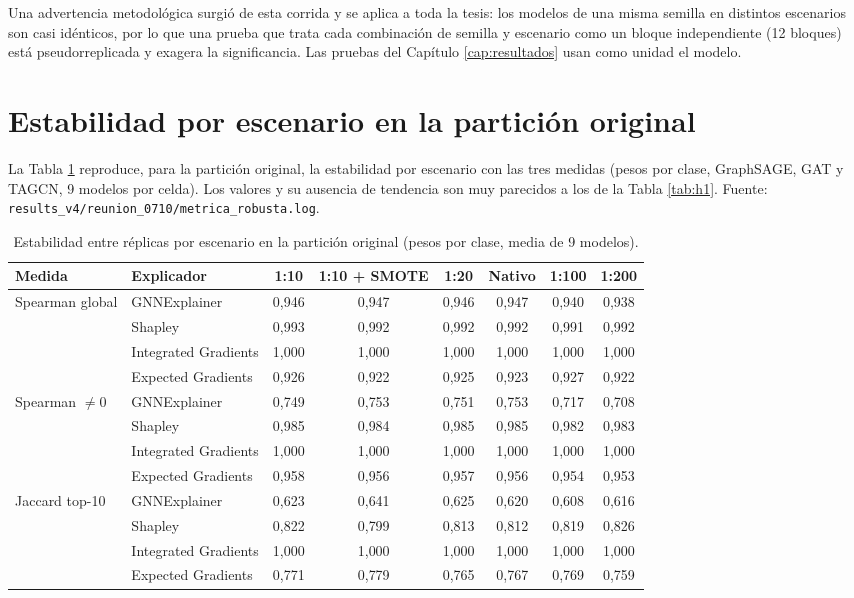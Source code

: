 Una advertencia metodológica surgió de esta corrida y se aplica a toda la tesis: los modelos de
una misma semilla en distintos escenarios son casi idénticos, por lo que una prueba que trata
cada combinación de semilla y escenario como un bloque independiente (12 bloques) está
pseudorreplicada y exagera la significancia. Las pruebas del Capítulo \ref{cap:resultados} usan
como unidad el modelo.

\section{Estabilidad por escenario en la partición original}

La Tabla \ref{tab:orig_h1} reproduce, para la partición original, la estabilidad por escenario
con las tres medidas (pesos por clase, GraphSAGE, GAT y TAGCN, 9 modelos por celda). Los valores
y su ausencia de tendencia son muy parecidos a los de la Tabla \ref{tab:h1}. Fuente:
\texttt{results\_v4/reunion\_0710/metrica\_robusta.log}.

\begin{table}[ht]
\centering
\caption{Estabilidad entre réplicas por escenario en la partición original (pesos por clase,
media de 9 modelos).}
\label{tab:orig_h1}
\scriptsize
\setlength{\tabcolsep}{4pt}
\begin{tabular}{llcccccc}
\toprule
Medida & Explicador & 1:10 & 1:10 + SMOTE & 1:20 & Nativo & 1:100 & 1:200 \\
\midrule
Spearman global & GNNExplainer & 0{,}946 & 0{,}947 & 0{,}946 & 0{,}947 & 0{,}940 & 0{,}938 \\
 & Shapley & 0{,}993 & 0{,}992 & 0{,}992 & 0{,}992 & 0{,}991 & 0{,}992 \\
 & Integrated Gradients & 1{,}000 & 1{,}000 & 1{,}000 & 1{,}000 & 1{,}000 & 1{,}000 \\
 & Expected Gradients & 0{,}926 & 0{,}922 & 0{,}925 & 0{,}923 & 0{,}927 & 0{,}922 \\
\midrule
Spearman $\neq 0$ & GNNExplainer & 0{,}749 & 0{,}753 & 0{,}751 & 0{,}753 & 0{,}717 & 0{,}708 \\
 & Shapley & 0{,}985 & 0{,}984 & 0{,}985 & 0{,}985 & 0{,}982 & 0{,}983 \\
 & Integrated Gradients & 1{,}000 & 1{,}000 & 1{,}000 & 1{,}000 & 1{,}000 & 1{,}000 \\
 & Expected Gradients & 0{,}958 & 0{,}956 & 0{,}957 & 0{,}956 & 0{,}954 & 0{,}953 \\
\midrule
Jaccard top-10 & GNNExplainer & 0{,}623 & 0{,}641 & 0{,}625 & 0{,}620 & 0{,}608 & 0{,}616 \\
 & Shapley & 0{,}822 & 0{,}799 & 0{,}813 & 0{,}812 & 0{,}819 & 0{,}826 \\
 & Integrated Gradients & 1{,}000 & 1{,}000 & 1{,}000 & 1{,}000 & 1{,}000 & 1{,}000 \\
 & Expected Gradients & 0{,}771 & 0{,}779 & 0{,}765 & 0{,}767 & 0{,}769 & 0{,}759 \\
\bottomrule
\end{tabular}
\end{table}

